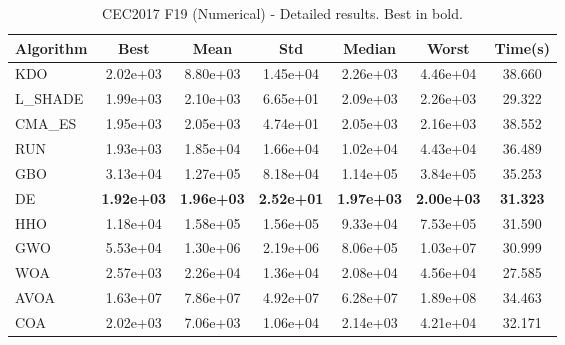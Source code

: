\begin{table}[H]
\centering\small
\caption{CEC2017 F19 (Numerical) - Detailed results. Best in bold.}
\label{tab:cec2017_F19}
\begin{tabular}{lcccccc}
\toprule
\textbf{Algorithm} & \textbf{Best} & \textbf{Mean} & \textbf{Std} & \textbf{Median} & \textbf{Worst} & \textbf{Time(s)} \\
\midrule
KDO & 2.02e+03 & 8.80e+03 & 1.45e+04 & 2.26e+03 & 4.46e+04 & 38.660 \\
L_SHADE & 1.99e+03 & 2.10e+03 & 6.65e+01 & 2.09e+03 & 2.26e+03 & 29.322 \\
CMA_ES & 1.95e+03 & 2.05e+03 & 4.74e+01 & 2.05e+03 & 2.16e+03 & 38.552 \\
RUN & 1.93e+03 & 1.85e+04 & 1.66e+04 & 1.02e+04 & 4.43e+04 & 36.489 \\
GBO & 3.13e+04 & 1.27e+05 & 8.18e+04 & 1.14e+05 & 3.84e+05 & 35.253 \\
DE & \textbf{1.92e+03} & \textbf{1.96e+03} & \textbf{2.52e+01} & \textbf{1.97e+03} & \textbf{2.00e+03} & \textbf{31.323} \\
HHO & 1.18e+04 & 1.58e+05 & 1.56e+05 & 9.33e+04 & 7.53e+05 & 31.590 \\
GWO & 5.53e+04 & 1.30e+06 & 2.19e+06 & 8.06e+05 & 1.03e+07 & 30.999 \\
WOA & 2.57e+03 & 2.26e+04 & 1.36e+04 & 2.08e+04 & 4.56e+04 & 27.585 \\
AVOA & 1.63e+07 & 7.86e+07 & 4.92e+07 & 6.28e+07 & 1.89e+08 & 34.463 \\
COA & 2.02e+03 & 7.06e+03 & 1.06e+04 & 2.14e+03 & 4.21e+04 & 32.171 \\
\bottomrule
\end{tabular}
\end{table}
